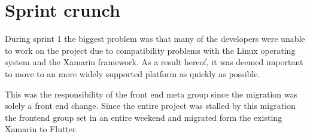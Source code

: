 \section{Sprint crunch}
During sprint 1 the biggest problem was that many of the developers were unable to work on the project due to compatibility problems with the Linux operating system and the Xamarin framework. 
As a result hereof, it was deemed important to move to an more widely supported platform as quickly as possible. 

This was the responsibility of the front end meta group since the migration was solely a front end change. 
Since the entire project was stalled by this migration the frontend group set in an entire weekend and migrated form the existing Xamarin to Flutter.
